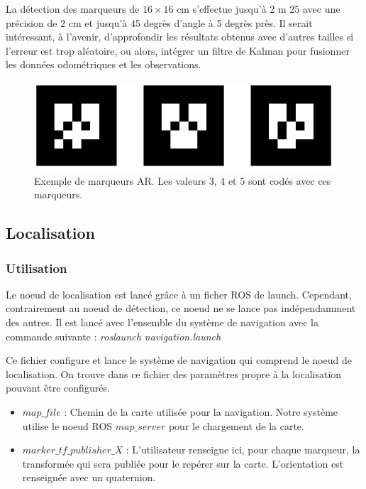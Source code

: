 \documentclass[10pt,a4paper]{article}
\begin{document}
La détection des marqueurs de $16 \times 16$ cm s'effectue jusqu'à 2 m 25 avec une précision de 2 cm et jusqu'à 45 degrès d'angle à 5 degrès près. Il serait intéressant, à l'avenir, d'approfondir les résultats obtenus avec d'autres tailles si l'erreur est trop aléatoire, ou alors, intégrer un filtre de Kalman pour fusionner les données odométriques et les observations.

\begin{figure}
\center
\includegraphics[scale=0.6]{figures/artags.png} 
\caption{Exemple de marqueurs AR. Les valeurs 3, 4 et 5 sont codés avec ces marqueurs.}	
\end{figure}


\subsection{Localisation}
\label{sec:localision}

\subsubsection*{Utilisation}
Le noeud de localisation est lancé gr\^ace à un ficher ROS de launch. Cependant, contrairement au noeud de détection, ce noeud ne se lance pas indépendamment des autres. Il est lancé avec l'ensemble du système de navigation avec la commande suivante : \textit{roslaunch navigation.launch}

Ce fichier configure et lance le système de navigation qui comprend le noeud de localisation. On trouve dans ce fichier des paramètres propre à la localisation pouvant être configurés.

\begin{itemize}
\item $map\_file$ : Chemin de la carte utilisée pour la navigation. Notre système utilise le noeud ROS $map\_server$ pour le chargement de la carte.
\item $marker\_tf\_publisher\_X$ : L'utilisateur renseigne ici, pour chaque marqueur, la transformée qui sera publiée pour le repérer sur la carte. L'orientation est renseignée avec un quaternion. 
\end{itemize}
\end{document}
